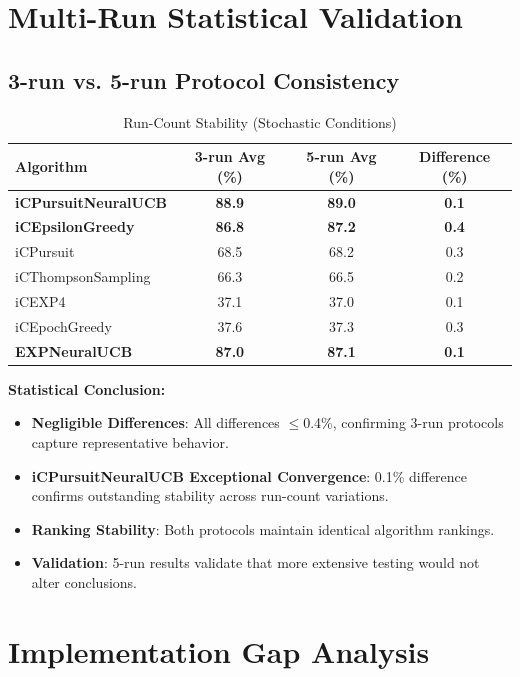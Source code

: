 \documentclass[12pt,a4paper]{article}
\newcommand{\success}[1]{\textcolor{accentgreen}{\textbf{#1}}}
\newcommand{\legacy}[1]{\textcolor{legacycolor}{\textbf{#1}}}
\newcommand{\neural}[1]{\textcolor{neuralcolor}{\textbf{#1}}}
\begin{document}
\section{Multi-Run Statistical Validation}

\subsection{3-run vs. 5-run Protocol Consistency}

\begin{table}[H]
\centering
\caption{Run-Count Stability (Stochastic Conditions)}
\label{tab:run-count}
\begin{tabular}{@{}lccc@{}}
\toprule
\textbf{Algorithm} & \textbf{3-run Avg (\%)} & \textbf{5-run Avg (\%)} & \textbf{Difference (\%)} \\
\midrule
\neural{iCPursuitNeuralUCB}   & \neural{88.9} & \neural{89.0} & \neural{0.1} \\
\success{iCEpsilonGreedy}   & \success{86.8} & \success{87.2} & \success{0.4} \\
iCPursuit                   & 68.5 & 68.2 & 0.3 \\
iCThompsonSampling          & 66.3 & 66.5 & 0.2 \\
iCEXP4                      & 37.1 & 37.0 & 0.1 \\
iCEpochGreedy               & 37.6 & 37.3 & 0.3 \\
\legacy{EXPNeuralUCB}       & \legacy{87.0} & \legacy{87.1} & \legacy{0.1} \\
\bottomrule
\end{tabular}
\end{table}

\textbf{Statistical Conclusion:}
\begin{itemize}
\item \success{Negligible Differences}: All differences $\leq$0.4\%, confirming 3-run protocols capture representative behavior.
\item \neural{iCPursuitNeuralUCB Exceptional Convergence}: 0.1\% difference confirms outstanding stability across run-count variations.
\item \success{Ranking Stability}: Both protocols maintain identical algorithm rankings.
\item \success{Validation}: 5-run results validate that more extensive testing would not alter conclusions.
\end{itemize}

\section{Implementation Gap Analysis}
\end{document}
